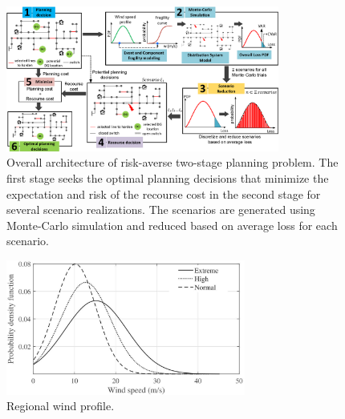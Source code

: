 \begin{figure}[t]
    \centering
    \includegraphics[width=0.8\textwidth]{figures/overall_picture.eps}
    \caption{Overall architecture of risk-averse two-stage planning problem. The first stage seeks the optimal planning decisions that minimize the expectation and risk of the recourse cost in the second stage for several scenario realizations. The scenarios are generated using Monte-Carlo simulation and reduced based on average loss for each scenario.}
    \label{fig:overall_architecture_framework}
\end{figure} 

\begin{figure}[h]
    \centering
    \includegraphics[width=0.7\textwidth]{figures/wind_profile.pdf}
    \caption{Regional wind profile.}
    \label{fig:wind_profile}
\end{figure}

